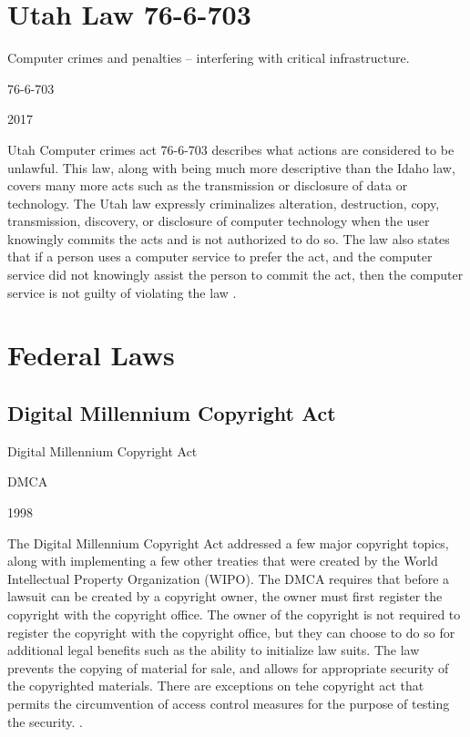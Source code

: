 \documentclass[14pt]{article}
\begin{document}
\section{Utah Law 76-6-703}
    \begin{description}[leftmargin=!, labelwidth=\widthof{\bfseries Year Approved}]
        \item [Name] Computer crimes and penalties -- interfering with critical infrastructure.
        \item [Abbreviation] 76-6-703
        \item [Year Approved] 2017
        \item [Description] Utah Computer crimes act 76-6-703 describes what actions are considered to be unlawful. This law, along with being much more descriptive than the Idaho law, covers many more acts such as the transmission or disclosure of data or technology. The Utah law expressly criminalizes alteration, destruction, copy, transmission, discovery, or disclosure of computer technology when the user knowingly commits the acts and is not authorized to do so. The law also states that if a person uses a computer service to prefer the act, and the computer service did not knowingly assist the person to commit the act, then the computer service is not guilty of violating the law \cite{Utah766703}.
    \end{description}

\section{Federal Laws}
\subsection{Digital Millennium Copyright Act}
    \begin{description}[leftmargin=!, labelwidth=\widthof{\bfseries Year Approved}]
        \item [Name] Digital Millennium Copyright Act
        \item [Abbreviation] DMCA
        \item [Year Approved] 1998
        \item [Description]  The Digital Millennium Copyright Act addressed a few major copyright topics, along with implementing a few other treaties that were created by the World Intellectual Property Organization (WIPO). The DMCA requires that before a lawsuit can be created by a copyright owner, the owner must first register the copyright with the copyright office. The owner of the copyright is not required to register the copyright with the copyright office, but they can choose to do so for additional legal benefits such as the ability to initialize law suits. The law prevents the copying of material for sale, and allows for appropriate security of the copyrighted materials. There are exceptions on tehe copyright act that permits the circumvention of access control measures for the purpose of testing the security. \cite{DMCA}.
    \end{description}
\end{document}
